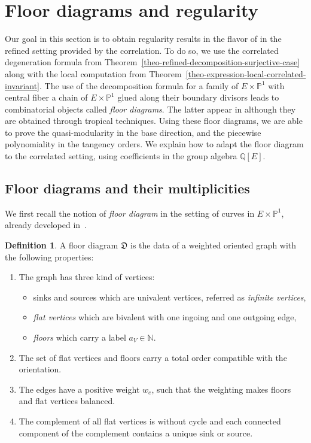 \documentclass[pdftex]{sigma}
\newcommand{\PP}{\mathbb{P}}
\newcommand{\NN}{\mathbb{N}}
\newcommand{\QQ}{\mathbb{Q}}
\newcommand{\Dfk}{\mathfrak{D}}
\numberwithin{equation}{section}
\theoremstyle{definition}
\newtheorem{defi}[theo]{Definition}
\begin{document}
\section{Floor diagrams and regularity}
\label{sec-regularity}

Our goal in this section is to obtain regularity results in the flavor of \cite{blomme2022floor} in the refined setting provided by the correlation. To do so, we use the correlated degeneration formula from Theorem~\ref{theo-refined-decomposition-surjective-case} along with the local computation from Theorem~\ref{theo-expression-local-correlated-invariant}. The use of the decomposition formula for a family of $E\times\PP^1$ with central fiber a chain of $E\times\PP^1$ glued along their boundary divisors leads to combinatorial objects called \textit{floor diagrams}. The latter appear in \cite{blomme2022floor} although they are obtained through tropical techniques. Using these floor diagrams, we are able to prove the quasi-modularity in the base direction, and the piecewise polynomiality in the tangency orders. We explain how to adapt the floor diagram to the correlated setting, using coefficients in the group algebra $\QQ[E]$.






\subsection{Floor diagrams and their multiplicities}

We first recall the notion of \textit{floor diagram} in the setting of curves in $E\times\PP^1$, already developed in~\cite{blomme2022floor}.

\begin{defi}
 A floor diagram $\Dfk$ is the data of a weighted oriented graph with the following properties:
 \begin{enumerate}\itemsep=-0.5pt
 \item[(1)] The graph has three kind of vertices:
 \begin{itemize}\itemsep=-0.5pt
 \item sinks and sources which are univalent vertices, referred as \textit{infinite vertices},
 \item \textit{flat vertices} which are bivalent with one ingoing and one outgoing edge,
 \item \textit{floors} which carry a label $a_V\in\NN$.
 \end{itemize}
 \item[(2)] The set of flat vertices and floors carry a total order compatible with the orientation.
 \item[(3)] The edges have a positive weight $w_e$, such that the weighting makes floors and flat vertices balanced.
 \item[(4)] The complement of all flat vertices is without cycle and each connected component of the complement contains a unique sink or source.
 \end{enumerate}
\end{defi}
\end{document}
